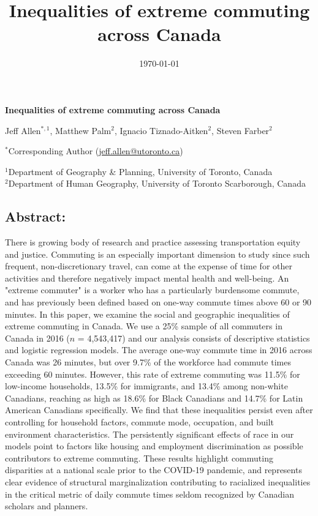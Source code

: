 \documentclass[10 pt,letterpaper]{article}
\title{
	Inequalities of extreme commuting across Canada
}
\date{
	\today}
\begin{document}
\LARGE
\textsf{\textbf{Inequalities of extreme commuting across Canada}}

\vspace{4mm}


	\large
	
	Jeff Allen$^{*,1}$, Matthew Palm$^{2}$, Ignacio Tiznado-Aitken$^{2}$, Steven Farber$^{2}$

	\normalsize
	
	$^{*}$Corresponding Author (\url{jeff.allen@utoronto.ca})
	
	
	$^{1}$Department of Geography \& Planning, 
	University of Toronto, Canada
	\\
	$^{2}$Department of Human Geography, University of Toronto Scarborough, Canada
	
	
	
	\subsection*{{Abstract:}}
	
	\vspace{-5mm}
	
	There is growing body of research and practice assessing transportation equity and justice. Commuting is an especially important dimension to study since such frequent, non-discretionary travel, can come at the expense of time for other activities and therefore negatively impact mental health and well-being. An "extreme commuter" is a worker who has a particularly burdensome commute, and has previously been defined based on one-way commute times above 60 or 90 minutes. In this paper, we examine the social and geographic inequalities of extreme commuting in Canada. We use a 25\% sample of all commuters in Canada in 2016 ($n$ = 4,543,417) and our analysis consists of descriptive statistics and logistic regression models. The average one-way commute time in 2016 across Canada was 26 minutes, but over 9.7\% of the workforce had commute times exceeding 60 minutes. However, this rate of extreme commuting was 11.5\% for low-income households, 13.5\% for immigrants, and 13.4\% among non-white Canadians, reaching as high as 18.6\% for Black Canadians and 14.7\% for Latin American Canadians specifically. We find that these inequalities persist even after controlling for household factors, commute mode, occupation, and built environment characteristics. The persistently significant effects of race in our models point to factors like housing and employment discrimination as possible contributors to extreme commuting. These results highlight commuting disparities at a national scale prior to the COVID-19 pandemic, and represents clear evidence of structural marginalization contributing to racialized inequalities in the critical metric of daily commute times seldom recognized by Canadian scholars and planners.
	
\end{document}
